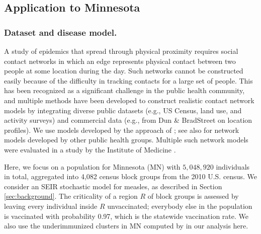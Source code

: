 \subsection{Application to Minnesota}
\subsubsection{Dataset and disease model.}
\label{sec:data}
A study of epidemics that spread through physical proximity requires social contact networks in which an edge represents physical contact
between two people at some location during the day. Such networks cannot be constructed easily because of the difficulty in tracking contacts for a large set of people.
This has been recognized as a significant challenge in the public health community,
and multiple methods have been developed to construct realistic contact
network models by integrating diverse public datasets
(e.g., US Census, land use, and activity surveys) and
commercial data (e.g., from Dun \& BradStreet on location profiles).
We use models developed by the approach of 
\cite{eubank:nature04}; %
see also \cite{longini05:science,fc+06} for network
models developed by other public health groups. %
Multiple such network models were evaluated in a study by the Institute of Medicine
\cite{halloran:pnas08}.

Here, we focus on a population for Minnesota (MN) with $5,048,920$ individuals in total, aggregated into 4,082 census block groups from the 2010 U.S. census. 
We consider an SEIR  stochastic model for measles, as described in
Section \ref{sec:background}.
The criticality of a region $R$ of block groups is assessed by leaving 
every individual inside $R$ unvaccinated; everybody else in the population 
is vaccinated with probability 0.97, which is the statewide vaccination rate. 
We also use the underimmunized clusters in MN computed by \cite{cadena:vacc-cluster}
in our analysis here.


